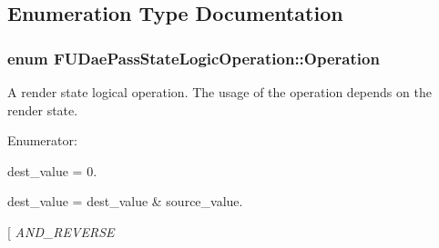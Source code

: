 \subsection{Enumeration Type Documentation}
\hypertarget{namespaceFUDaePassStateLogicOperation_aabe5119ffa94a96a4936012f067b7ff4}{
\subsubsection[{Operation}]{\setlength{\rightskip}{0pt plus 5cm}enum {\bf FUDaePassStateLogicOperation::Operation}}}
\label{namespaceFUDaePassStateLogicOperation_aabe5119ffa94a96a4936012f067b7ff4}
A render state logical operation. The usage of the operation depends on the render state. \begin{Desc}
\item[Enumerator: ]\par
\begin{description}
\item[{\em 
\hypertarget{namespaceFUDaePassStateLogicOperation_aabe5119ffa94a96a4936012f067b7ff4a57fe51ba8e46d1af947e49125c86d6ba}{
CLEAR}
\label{namespaceFUDaePassStateLogicOperation_aabe5119ffa94a96a4936012f067b7ff4a57fe51ba8e46d1af947e49125c86d6ba}
}]dest\_\-value = 0. \item[{\em 
\hypertarget{namespaceFUDaePassStateLogicOperation_aabe5119ffa94a96a4936012f067b7ff4ae6a18101026e543b0f0c1e9c61f1a8dc}{
AND}
\label{namespaceFUDaePassStateLogicOperation_aabe5119ffa94a96a4936012f067b7ff4ae6a18101026e543b0f0c1e9c61f1a8dc}
}]dest\_\-value = dest\_\-value \& source\_\-value. \item[{\em 
\hypertarget{namespaceFUDaePassStateLogicOperation_aabe5119ffa94a96a4936012f067b7ff4af0e926d1bd54a09b3babd232b4e3ac6a}{
AND\_\-REVERSE}
\label{namespaceFUDaePassStateLogicOperation_aabe5119ffa94a96a4936012f067b7ff4af0e926d1bd54a09b3babd232b4e3ac6a}
}
\end{description}
\end{Desc}
